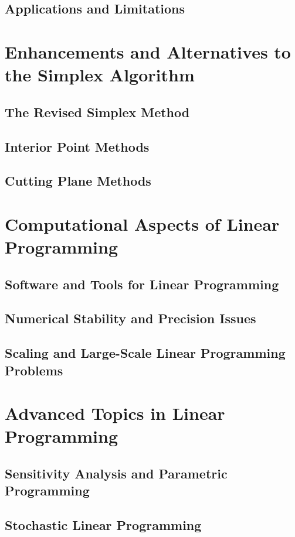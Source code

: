 \documentclass[12pt]{book} %
\begin{document}
\subsection{Applications and Limitations}

\section{Enhancements and Alternatives to the Simplex Algorithm}
\subsection{The Revised Simplex Method}
\subsection{Interior Point Methods}
\subsection{Cutting Plane Methods}

\section{Computational Aspects of Linear Programming}
\subsection{Software and Tools for Linear Programming}
\subsection{Numerical Stability and Precision Issues}
\subsection{Scaling and Large-Scale Linear Programming Problems}

\section{Advanced Topics in Linear Programming}
\subsection{Sensitivity Analysis and Parametric Programming}
\subsection{Stochastic Linear Programming}
\end{document}
